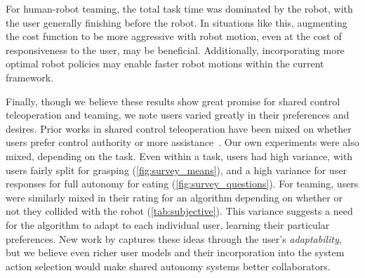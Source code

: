 For human-robot teaming, the total task time was dominated by the robot, with the user generally finishing before the robot. In situations like this, augmenting the cost function to be more aggressive with robot motion, even at the cost of responsiveness to the user, may be beneficial. Additionally, incorporating more optimal robot policies may enable faster robot motions within the current framework.

Finally, though we believe these results show great promise for shared control teleoperation and teaming, we note users varied greatly in their preferences and desires. Prior works in shared control teleoperation have been mixed on whether users prefer control authority or more assistance~\cite{you_2011, kim_2012, dragan_2013_assistive}. Our own experiments were also mixed, depending on the task. Even within a task, users had high variance, with users fairly split for grasping (\cref{fig:survey_means}), and a high variance for user responses for full autonomy for eating (\cref{fig:survey_questions}). For teaming, users were similarly mixed in their rating for an algorithm depending on whether or not they collided with the robot (\cref{tab:subjective}). This variance suggests a need for the algorithm to adapt to each individual user, learning their particular preferences. New work by \citet{nikolaidis_2017_shared} captures these ideas through the user's \emph{adaptability}, but we believe even richer user models and their incorporation into the system action selection would make shared autonomy systems better collaborators.


 


